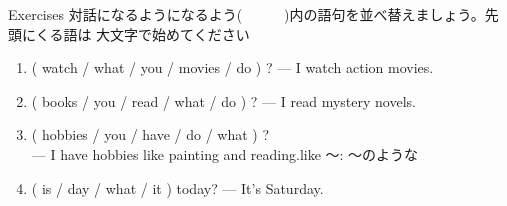 \documentclass[aspectratio=169,xcolor={dvipsnames,table}]{beamer}
\begin{document}
\begin{frame}[plain]{Exercises}
 対話になるようになるよう(~~~~~~)内の語句を並べ替えましょう。先頭にくる語は
大文字で始めてください
\begin{enumerate}
 \item ( watch / what / you / movies / do ) ? --- I watch action movies.\\
 \item ( books / you / read / what / do ) ? --- I read mystery novels.\\
 \item ( hobbies / you / have / do / what ) ?\\
\mbox{}\hfill{}--- I have hobbies like painting and reading.\hfill{}{\small like 〜: 〜のような}\\
 \item ( is / day / what / it )  today? --- It's Saturday.\\
\hfill{}
\end{enumerate}
\mbox{}\hfill{\scriptsize {}}

\end{frame}
\end{document}
